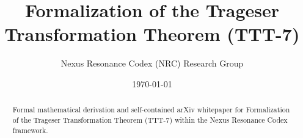 \documentclass[11pt,a4paper]{article}
\title{Formalization of the Trageser Transformation Theorem (TTT-7)}
\author{Nexus Resonance Codex (NRC) Research Group}
\date{\today}
\begin{document}
\maketitle

\begin{abstract}
Formal mathematical derivation and self-contained arXiv whitepaper for Formalization of the Trageser Transformation Theorem (TTT-7) within the Nexus Resonance Codex framework.
\end{abstract}





\end{document}
